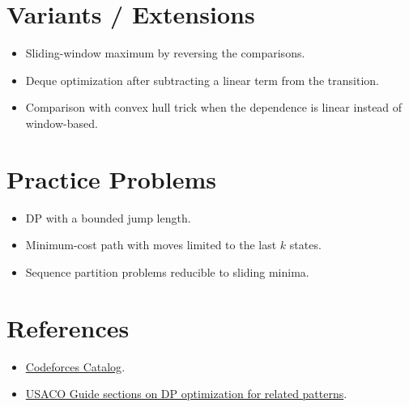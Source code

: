 \section*{Variants / Extensions}

\begin{itemize}
  \item Sliding-window maximum by reversing the comparisons.
  \item Deque optimization after subtracting a linear term from the transition.
  \item Comparison with convex hull trick when the dependence is linear instead of window-based.
\end{itemize}

\section*{Practice Problems}

\begin{itemize}
  \item DP with a bounded jump length.
  \item Minimum-cost path with moves limited to the last \(k\) states.
  \item Sequence partition problems reducible to sliding minima.
\end{itemize}

\section*{References}

\begin{itemize}
  \item \href{https://codeforces.com/catalog}{Codeforces Catalog}.
  \item \href{https://usaco.guide/plat/convex-hull-trick}{USACO Guide sections on DP optimization for related patterns}.
\end{itemize}
